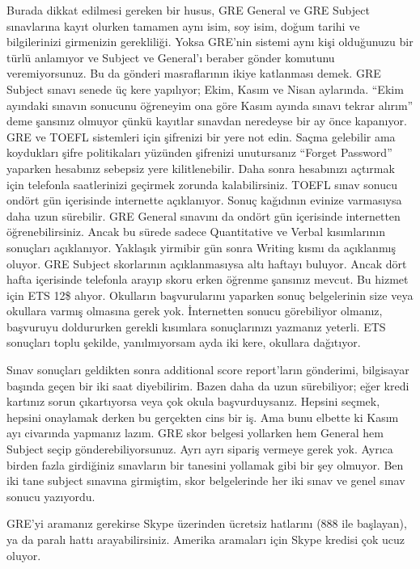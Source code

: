 \documentclass[12pt]{article}
\theoremstyle{break}
\begin{document}
Burada dikkat edilmesi gereken bir husus, GRE General ve GRE Subject sınavlarına kayıt olurken tamamen aynı isim, soy isim, doğum tarihi ve bilgilerinizi girmenizin gerekliliği. Yoksa GRE’nin sistemi aynı kişi olduğunuzu bir türlü anlamıyor ve Subject ve General’ı beraber gönder komutunu veremiyorsunuz. Bu da gönderi masraflarının ikiye katlanması demek. GRE Subject sınavı senede üç kere yapılıyor; Ekim, Kasım ve Nisan aylarında. ``Ekim ayındaki sınavın sonucunu öğreneyim ona göre Kasım ayında sınavı tekrar alırım'' deme şansınız olmuyor çünkü kayıtlar sınavdan neredeyse bir ay önce kapanıyor. GRE ve TOEFL sistemleri için şifrenizi bir yere not edin. Saçma gelebilir ama koydukları şifre politikaları yüzünden şifrenizi unutursanız “Forget Password” yaparken hesabınız sebepsiz yere kilitlenebilir. Daha sonra hesabınızı açtırmak için telefonla saatlerinizi geçirmek zorunda kalabilirsiniz. TOEFL sınav sonucu ondört gün içerisinde internette açıklanıyor. Sonuç kağıdının evinize varmasıysa daha uzun sürebilir. GRE General sınavını da ondört gün içerisinde internetten öğrenebilirsiniz. Ancak bu sürede sadece Quantitative ve Verbal kısımlarının sonuçları açıklanıyor. Yaklaşık yirmibir gün sonra Writing kısmı da açıklanmış oluyor. GRE Subject skorlarının açıklanmasıysa altı haftayı buluyor. Ancak dört hafta içerisinde telefonla arayıp skoru erken öğrenme şansınız mevcut. Bu hizmet için ETS 12\$ alıyor. Okulların başvurularını yaparken sonuç belgelerinin size veya okullara varmış olmasına gerek yok. İnternetten sonucu görebiliyor olmanız, başvuruyu doldururken gerekli kısımlara sonuçlarınızı yazmanız yeterli. ETS sonuçları toplu şekilde, yanılmıyorsam ayda iki kere, okullara dağıtıyor.

Sınav sonuçları geldikten sonra additional score report’ların gönderimi, bilgisayar başında geçen bir iki saat diyebilirim. Bazen daha da uzun sürebiliyor; eğer kredi kartınız sorun çıkartıyorsa veya çok okula başvurduysanız. Hepsini seçmek, hepsini onaylamak derken bu gerçekten cins bir iş. Ama bunu elbette ki Kasım ayı civarında yapmanız lazım. GRE skor belgesi yollarken hem General hem Subject seçip gönderebiliyorsunuz. Ayrı ayrı sipariş vermeye gerek yok. Ayrıca birden fazla girdiğiniz sınavların bir tanesini yollamak gibi bir şey olmuyor. Ben iki tane subject sınavına girmiştim, skor belgelerinde her iki sınav ve genel sınav sonucu yazıyordu.

GRE’yi aramanız gerekirse Skype üzerinden ücretsiz hatlarını (888 ile başlayan), ya da paralı hattı arayabilirsiniz. Amerika aramaları için Skype kredisi çok ucuz oluyor.
 
\end{document}
